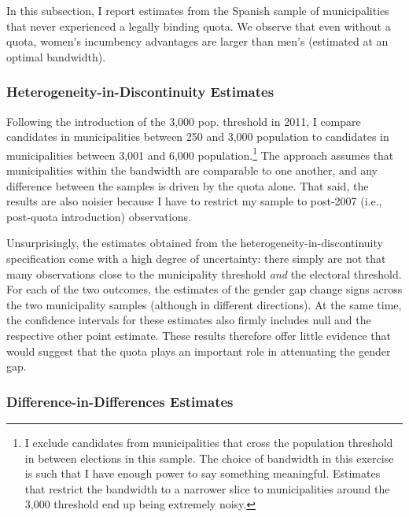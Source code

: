 \documentclass[12pt]{article}
\begin{document}
In this subsection, I report estimates from the Spanish sample of municipalities that never experienced a legally binding quota. We observe that even without a quota, women's incumbency advantages are larger than men's (estimated at an optimal bandwidth).



\clearpage
\subsubsection{Heterogeneity-in-Discontinuity Estimates}
\label{app:diff-in-disc-quota}

Following the introduction of the 3,000 pop. threshold in 2011, I compare candidates in municipalities between 250 and 3,000 population to candidates in municipalities between 3,001 and 6,000 population.\footnote{I exclude candidates from municipalities that cross the population threshold in between elections in this sample. The choice of bandwidth in this exercise is such that I have enough power to say something meaningful. Estimates that restrict the bandwidth to a narrower slice to municipalities around the 3,000 threshold end up being extremely noisy.} The approach assumes that municipalities within the bandwidth are comparable to one another, and any difference between the samples is driven by the quota alone. That said, the results are also noisier because I have to restrict my sample to post-2007 (i.e., post-quota introduction) observations.

Unsurprisingly, the estimates obtained from the heterogeneity-in-discontinuity specification come with a high degree of uncertainty: there simply are not that many observations close to the municipality threshold \emph{and} the electoral threshold. For each of the two outcomes, the estimates of the gender gap change signs across the two municipality samples (although in different directions). At the same time, the confidence intervals for these estimates also firmly includes null and the respective other point estimate. These results therefore offer little evidence that would suggest that the quota plays an important role in attenuating the gender gap.



\clearpage
\subsubsection{Difference-in-Differences Estimates}
\label{app:diff-in-diff-quota}
\end{document}
